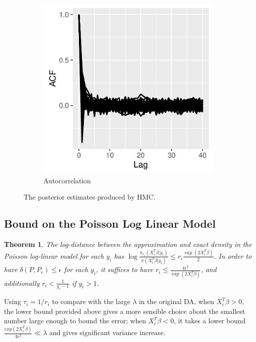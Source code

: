 \documentclass[10pt]{article}
\newtheorem{theorem}{Theorem}
\begin{document}
\begin{figure}[H]
\begin{subfigure}[b]{0.45\textwidth}
 \includegraphics[width=1\textwidth]{poisson_hmc_acf.pdf}
 \caption{Autocorrelation}
 \end{subfigure}  
 \caption{The posterior estimates produced by HMC.}
 \end{figure}
 
 

\subsection{Bound on the Poisson Log Linear Model}



\begin{theorem}
The log-distance between the approximation and exact density in the Poisson log-linear model for each $y_i$ has $\log\frac{\pi_{r_i}(X_i^T\beta|y_i)}{\pi(X_i^T\beta|y_i)} \le     r_i \frac{\exp(2 X_i^T\beta)}{2}$. In order to have $\delta(P,P_r)\le\epsilon$ for each $y_i$, it suffices to have $r_i \le \frac{4\epsilon^2}{\exp(2 X_i^T\beta)}$, and additionally $r_i<\frac{1}{y_i-1}$ if $y_i>1$.
\end{theorem}

Using $\tau_i=1/r_i$ to compare with the large $\lambda$ in the original DA, when  $X_i^T\beta>0$, the lower bound provided above gives a more sensible choice about the smallest number large enough to bound the error; when $X_i^T\beta<0$, it takes a lower bound $ \frac{exp(2X_i^T\beta)}{4\epsilon^2}\ll \lambda$ and gives significant variance increase.  
\end{document}
